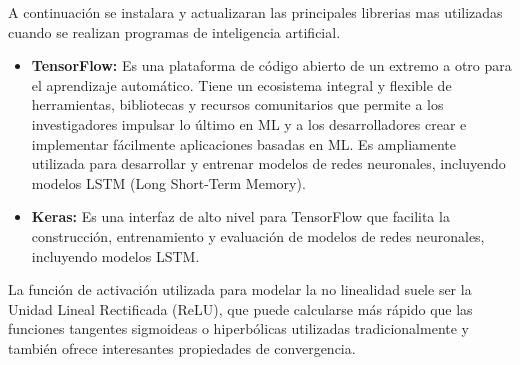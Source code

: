 A continuación se instalara y actualizaran las principales librerias mas utilizadas cuando se realizan programas de inteligencia artificial.

\begin{itemize}
  \item \textbf{TensorFlow:} Es una plataforma de código abierto de un extremo a otro para el aprendizaje automático. Tiene un ecosistema integral y flexible de herramientas, bibliotecas y recursos comunitarios que permite a los investigadores impulsar lo último en ML y a los desarrolladores crear e implementar fácilmente aplicaciones basadas en ML.
  Es ampliamente utilizada para desarrollar y entrenar modelos de redes neuronales, incluyendo modelos LSTM (Long Short-Term Memory).
  \item \textbf{Keras:} Es una interfaz de alto nivel para TensorFlow que facilita la construcción, entrenamiento y evaluación de modelos de redes neuronales, incluyendo modelos LSTM.
\end{itemize}



La función de activación utilizada para modelar la no linealidad suele ser la Unidad Lineal Rectificada (ReLU), que puede calcularse más rápido que las funciones tangentes sigmoideas o hiperbólicas utilizadas tradicionalmente y también ofrece interesantes propiedades de convergencia.



